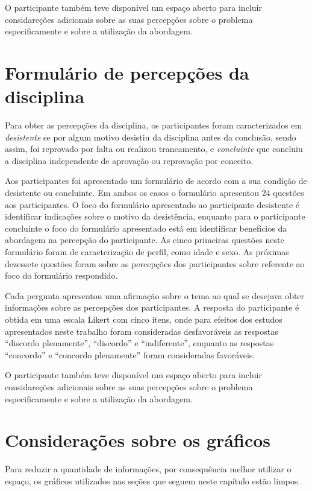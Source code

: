 O participante também teve disponível um espaço aberto para incluir considareções adicionais sobre
as suas percepções sobre o problema especificamente e sobre a utilização da abordagem.

\section{Formulário de percepções da disciplina}
\label{form-disciplinas}
Para obter as percepções da disciplina, os participantes foram caracterizados em \textit{desistente}
se por algum motivo desistiu da disciplina antes da conclusão, sendo assim, foi reprovado por
falta ou realizou trancamento, e \textit{concluinte} que concluiu a disciplina independente
de aprovação ou reprovação por conceito.

Aos participantes foi apresentado um formulário de acordo com a sua condição de desistente
ou concluinte.
Em ambos os casos o formulário apresentou 24 questões aos participantes.
O foco do formulário apresentado ao participante desistente é identificar indicações
sobre o motivo da desistência, enquanto para o participante concluinte o foco do
formulário apresentado está em identificar benefícios da abordagem na percepção
do participante.
As cinco primeiras questões neste formulário foram de caracterização de perfil, como
idade e sexo.
As próximas dezessete questões foram sobre as percepções dos participantes sobre referente
ao foco do formulário respondido.

Cada pergunta apresentou uma afirmação sobre o tema ao qual se desejava obter informações sobre as
percepções dos participantes.
A resposta do participante é obtida em uma escala Likert com cinco itens, onde para efeitos dos estudos
apresentados neste trabalho foram consideradas desfavoráveis
as respostas ``discordo plenamente'', ``discordo'' e ``indiferente'', enquanto as
respostas ``concordo'' e ``concordo plenamente'' foram consideradas favoráveis.

O participante também teve disponível um espaço aberto para incluir considareções adicionais sobre
as suas percepções sobre o problema especificamente e sobre a utilização da abordagem.

\section{Considerações sobre os gráficos}
\label{sec-ref-graficos}
Para reduzir a quantidade de informações, por consequência melhor utilizar o
espaço, os gráficos utilizados nas seções que seguem neste capítulo
estão limpos.

